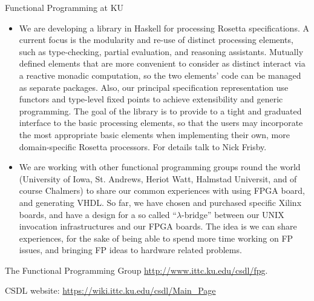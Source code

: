 \documentclass{article}
\begin{document}
\begin{hcarentry}{Functional Programming at KU}
\begin{itemize}
\item We are developing a library in Haskell for processing Rosetta specifications.
A current focus is the modularity and re-use of distinct processing
elements, such as type-checking, partial evaluation, and reasoning
assistants. Mutually defined elements that are more convenient to
consider as distinct interact via a reactive monadic computation, so
the two elements' code can be managed as separate packages. Also, our
principal specification representation use functors and type-level
fixed points to achieve extensibility and generic programming. The
goal of the library is to provide to a tight and graduated interface
to the basic processing elements, so that the users may incorporate
the most appropriate basic elements when implementing their own, more
domain-specific Rosetta processors. For details talk to Nick Frisby.

\item We are working with other functional programming groups round the world (University of Iowa, St. Andrews, Heriot Watt, Halmstad Universit, and of course Chalmers) to share our common experiences with using FPGA board, and generating VHDL.
So far, we have chosen and purchased specific Xilinx boards, and have a design for a so called ``$\lambda$-bridge'' between our UNIX invocation infrastructures and our FPGA boards. The idea is we can share experiences, for the sake of 
being able to spend more time working on FP issues, and bringing FP ideas to hardware related problems.
\end{itemize}

\FurtherReading
  The Functional Programming Group
    \url{http://www.ittc.ku.edu/csdl/fpg}.

  CSDL website: \url{https://wiki.ittc.ku.edu/csdl/Main_Page}
\end{hcarentry}
\end{document}
